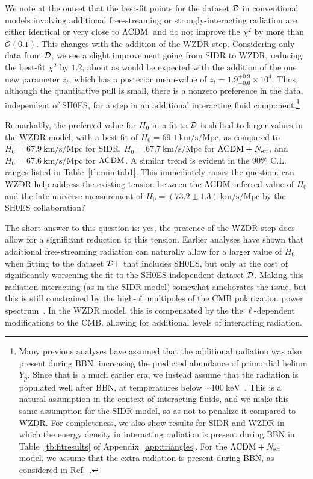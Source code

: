 \documentclass[aps,prd,twocolumn,nofootinbib,superscriptaddress]{revtex4}
\newcommand{\keV}{\text{keV}}
\newcommand{\order}[1]{\mathcal{O}{(#1)}}
\newcommand{\D}{\cal{D}}
\newcommand{\ksm}{\text{km} / \text{s} / \text{Mpc}}
\newcommand{\App}[1]{Appendix~\ref{app:#1}}
\newcommand{\Tab}[1]{Table~\ref{tb:#1}}
\newcommand{\zt}{z_t}
\def\lcdm{$\Lambda{\rm CDM}$}
\newcommand{\Neff}{N_{\rm eff}}
\begin{document}
We note at the outset that the best-fit points for the dataset $\D$ in conventional models involving additional free-streaming or strongly-interacting radiation are either identical or very close to \lcdm\ and do not improve the $\chi^2$ by more than $\order{0.1}$. This changes with the addition of the WZDR-step. Considering only data from $\D$, we see a slight improvement going from SIDR to WZDR, reducing the best-fit $\chi^2$ by $1.2$, about as would be expected with the addition of the one new parameter $\zt$, which has a posterior mean-value of $\zt = 1.9_{-0.6}^{+0.9} \times 10^4$. Thus, although the quantitative pull is small, there is a nonzero preference in the data, independent of SH0ES, for a step in an additional interacting fluid component.\footnote{Many previous analyses have assumed that the additional radiation was also present during BBN, increasing the predicted abundance of primordial helium $Y_p$. Since that is a much earlier era, we instead assume that the radiation is populated well after BBN, at temperatures below $\sim 100 \ \keV$~\cite{Berlin:2019pbq}. This is a natural assumption in the context of interacting fluids, and we make this same assumption for the SIDR model, so as not to penalize it compared to WZDR.
For completeness, we also show results for SIDR and WZDR in which the energy density in interacting radiation is present during BBN in \Tab{fitresults} of \App{triangles}. For the $\Lambda \text{CDM} + \Neff$ model, we assume that the extra radiation is present during BBN, as considered in Ref.~\cite{Schoneberg:2021qvd}.} 

Remarkably, the preferred value for $H_0$ in a fit to $\D$ is shifted to larger values in the WZDR model, with a best-fit of $H_0= 69.1 \ \ksm$, as compared to $H_0 = 67.9 \ \ksm$ for SIDR, $H_0=67.7 \ \ksm$ for $\text{$\Lambda$CDM} + \Neff$, and $H_0=67.6 \ \ksm$ for \lcdm.
A similar trend is evident in the 90\% C.L. ranges listed in \Tab{minitab1}. This immediately raises the question: can WZDR help address the existing tension between the \lcdm-inferred value of $H_0$ and the late-universe measurement of $H_0=(73.2 \pm 1.3) \ \ksm$ by the SH0ES collaboration?

The short answer to this question is: yes, the presence of the WZDR-step does allow for a significant reduction to this tension. Earlier analyses have shown that additional free-streaming radiation can naturally allow for a larger value of $H_0$ when fitting to the dataset $\D+$ that includes SH0ES, but only at the cost of significantly worsening the fit to the SH0ES-independent dataset $\D$. Making this radiation interacting (as in the SIDR model) somewhat ameliorates the issue, but this is still constrained by the high-$\ell$ multipoles of the CMB polarization power spectrum~\cite{Bernal:2016gxb,Blinov:2020hmc,Brinckmann:2020bcn}. In the WZDR model, this is compensated by the the $\ell$-dependent modifications to the CMB, allowing for additional levels of interacting radiation.
\end{document}
